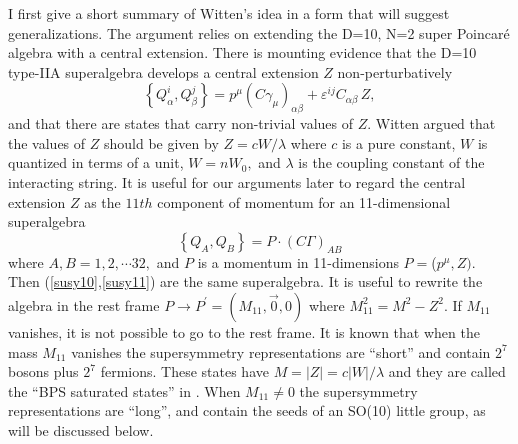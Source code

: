 I first give a short summary of Witten's idea in a form that will suggest
generalizations. The argument relies on extending the D=10, N=2 super
Poincar\'e algebra with a central extension. There is mounting evidence that
the D=10 type-IIA superalgebra develops a central extension $Z$
non-perturbatively
\begin{equation}
\left\{ Q_\alpha ^i,Q_\beta ^j\right\} =p^\mu \left( C\gamma _\mu \right)
_{\alpha \beta }+\varepsilon ^{ij}C_{\alpha \beta }\,Z,  \label{susy10}
\end{equation}
and that there are states that carry non-trivial values of $Z.$ Witten
argued that the values of $Z$ should be given by $Z=cW/\lambda $ where $c$
is a pure constant, $W$ is quantized in terms of a unit, $W=nW_0,$ and $%
\lambda $ is the coupling constant of the interacting string. It is useful
for our arguments later to regard the central extension $Z$ as the $11th$
component of momentum for an 11-dimensional superalgebra
\begin{equation}
\left\{ Q_A,Q_B\right\} =P\cdot \left( C\Gamma \right) _{AB}  \label{susy11}
\end{equation}
where $A,B=1,2,\cdots 32,$ and $P$ is a momentum in 11-dimensions $P=$($%
p^\mu ,Z).$ Then (\ref{susy10},\ref{susy11}) are the same superalgebra. It
is useful to rewrite the algebra in the rest frame $P\rightarrow P^{\prime
}=(M_{11},\vec 0,0)$ where $M_{11}^2=M^2-Z^2.$ If $M_{11}$ vanishes, it is
not possible to go to the rest frame. It is known that when the mass $M_{11}$
vanishes the supersymmetry representations are ``short'' and contain $2^7$
bosons plus $2^7$ fermions. These states have $M=\left| Z\right| =c\left|
W\right| /\lambda $ and they are called the ``BPS saturated states'' in \cite
{witten}. When $M_{11}\neq 0$ the supersymmetry representations are
``long'', and contain the seeds of an SO(10) little group, as will be
discussed below.

